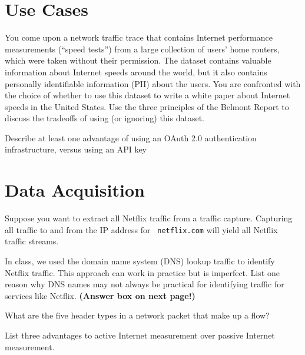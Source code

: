 \section*{Use Cases}

 You come upon a network traffic trace that contains Internet
performance measurements (``speed tests'') from a large collection of users'
home routers, which were taken without their permission. The dataset contains
valuable information about Internet speeds around the world, but it also
contains personally identifiable information (PII) about the users. You are
confronted with the choice of whether to use this dataset to write a white
paper about Internet speeds in the United States. Use the three principles of
the Belmont Report to discuss the tradeoffs of using (or ignoring) this dataset. 


\eprob

 Describe at least one advantage of using an OAuth 2.0 authentication
infrastructure, versus using an API key

\eprob

\section*{Data Acquisition}

 Suppose you want to extract all Netflix traffic from a traffic
capture.  Capturing all traffic to and from the IP address for {\tt
netflix.com}  will yield all Netflix traffic streams.
\framebox{
\yesnono
}
\eprob

In class, we used the domain name system (DNS) lookup traffic to identify Netflix
traffic. This approach can work in practice but is imperfect. List one reason
why DNS names may not always be practical for identifying traffic for services
like Netflix. {\bf (Answer box on next page!)}

\eprob

What are the five header types in a network packet that make up a flow?

\eprob

List three advantages to active Internet measurement over passive Internet measurement.

